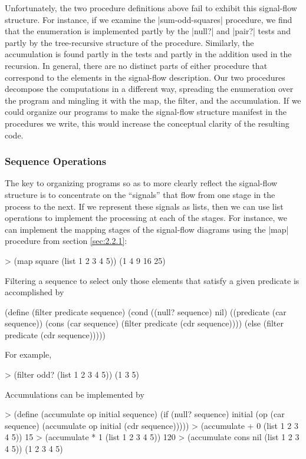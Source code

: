 Unfortunately, the two procedure definitions above fail to exhibit
this signal-flow structure.  For instance, if we examine the
\scheme|sum-odd-squares| procedure, we find that the enumeration is
implemented partly by the \scheme|null?| and \scheme|pair?| tests and
partly by the tree-recursive structure of the procedure.  Similarly,
the accumulation is found partly in the tests and partly in the
addition used in the recursion.  In general, there are no distinct
parts of either procedure that correspond to the elements in the
signal-flow description.  Our two procedures decompose the
computations in a different way, spreading the enumeration over the
program and mingling it with the map, the filter, and the
accumulation.  If we could organize our programs to make the
signal-flow structure manifest in the procedures we write, this would
increase the conceptual clarity of the resulting code.

\subsubsection*{Sequence Operations}

The key to organizing programs so as to more clearly reflect the
signal-flow structure is to concentrate on the ``signals'' that flow
from one stage in the process to the next.  If we represent these
signals as lists, then we can use list operations to implement the
processing at each of the stages.  For instance, we can implement the
mapping stages of the signal-flow diagrams using the \scheme|map|
procedure from section \ref{sec:2.2.1}:

\begin{schemedisplay}
> (map square (list 1 2 3 4 5))
(1 4 9 16 25)
\end{schemedisplay}

Filtering a sequence to select only those elements that satisfy a
given predicate is accomplished by

\begin{schemedisplay}
(define (filter predicate sequence)
  (cond ((null? sequence) nil)
        ((predicate (car sequence))
         (cons (car sequence)
               (filter predicate (cdr sequence))))
        (else (filter predicate (cdr sequence)))))
\end{schemedisplay}
For example,
\begin{schemedisplay}
> (filter odd? (list 1 2 3 4 5))
(1 3 5)
\end{schemedisplay}

Accumulations can be implemented by
\begin{schemedisplay}
> (define (accumulate op initial sequence)
    (if (null? sequence)
        initial
        (op (car sequence)
            (accumulate op initial (cdr sequence)))))
> (accumulate + 0 (list 1 2 3 4 5))
15
> (accumulate * 1 (list 1 2 3 4 5))
120
> (accumulate cons nil (list 1 2 3 4 5))
(1 2 3 4 5)
\end{schemedisplay}

